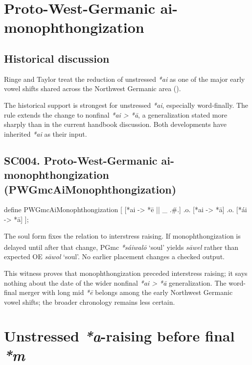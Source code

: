 \documentclass[
  british,
  a4paper,
  openany]{book}
\providecommand{\Pred}[1]{\textsuperscript{\dag}\emph{#1}}
\providecommand{\Recon}[1]{\emph{*#1}}
{\catcode`→=\active \global\def→{\ensuremath{\rightarrow}}}
\providecommand{\texorpdfstring}[2]{#1}
\DeclareRobustCommand{\CAPRRuleHeading}[2]{%
  #1\texorpdfstring{\\(#2)}{ (#2)}%
}
\providecommand{\Pred}[1]{\textsuperscript{\dag}\emph{#1}}
\providecommand{\Recon}[1]{\emph{*#1}}
{\catcode`→=\active \global\def→{\ensuremath{\rightarrow}}}
\begin{document}
\section{Proto-West-Germanic
ai-monophthongization}\label{proto-west-germanic-ai-monophthongization}

\subsection{Historical discussion}\label{historical-discussion-1}

Ringe and Taylor treat the reduction of unstressed \emph{*ai} as one of
the major early vowel shifts shared across the Northwest Germanic area
().

The historical support is strongest for unstressed \emph{*ai},
especially word-finally. The rule extends the change to nonfinal
\emph{*ai > *ā}, a generalization stated more sharply than in the
current handbook discussion. Both developments have inherited \emph{*ai}
as their input.

\subsection{\texorpdfstring{\CAPRRuleHeading{SC004. Proto-West-Germanic ai-monophthongization}{PWGmcAiMonophthongization}}{}}\label{rule-PWGmcAiMonophthongization}

\begin{ReaderFacingFoma}
define PWGmcAiMonophthongization [
    [{*ai} -> {*ē} || _ .#.]
    .o.
    [{*ai} -> {*ā}]
    .o.
    [{*ái} -> {*ā}]
];
\end{ReaderFacingFoma}

The soul form fixes the relation to interstress raising. If
monophthongization is delayed until after that change, PGmc
\Recon{sáiwalō} `soul' yields \Pred{sāwel} rather than expected OE
\emph{sāwol} `soul'. No earlier placement changes a checked output.

This witness proves that monophthongization preceded interstress
raising; it says nothing about the date of the wider nonfinal
\emph{*ai > *ā} generalization. The word-final merger with long mid
\emph{*ē} belongs among the early Northwest Germanic vowel shifts; the
broader chronology remains less certain.

\newpage

\section{\texorpdfstring{Unstressed \emph{*a}-raising before final
\emph{*m}}{Unstressed -raising before final }}\label{unstressed--raising-before-final}
\end{document}
